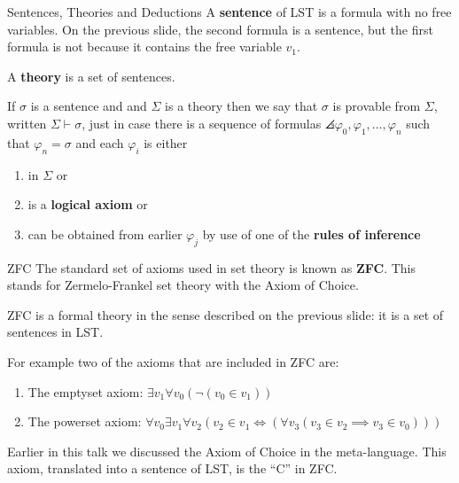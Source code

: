 \documentclass[pdf,final]{prosper}
\newcommand{\skipsmall}{\vspace{1em}}
\begin{document}
\begin{slide}{Sentences, Theories and Deductions}
A \textbf{sentence} of LST is a formula with no free variables. On the previous
slide, the second formula is a sentence, but the first formula is not because it
contains the free variable $v_1$.

\skipsmall

A \textbf{theory} is a set of sentences.

\skipsmall

If $\sigma$ is a sentence and and $\Sigma$ is a theory then we say that $\sigma$
is provable from $\Sigma$, written $\Sigma\vdash\sigma$, just in case there is a
sequence of formulas $\angles{\varphi_0,\varphi_1,\dots,\varphi_n}$ such that
$\varphi_n=\sigma$ and each $\varphi_i$ is either
\begin{enumerate}
  \item in $\Sigma$ or
  \item is a \textbf{logical axiom} or
  \item can be obtained from earlier $\varphi_j$ by use of one of the \textbf{rules
  of inference}
\end{enumerate}

\end{slide}

\begin{slide}{ZFC}
The standard set of axioms used in set theory is known as \textbf{ZFC}. This
stands for Zermelo-Frankel set theory with the Axiom of Choice.

\skipsmall

ZFC is a formal theory in the sense described on the previous slide: it is a set
of sentences in LST.

\skipsmall

For example two of the axioms that are included in ZFC are:

\begin{enumerate}
  \item The emptyset axiom: $\exists v_1\forall v_0(\neg(v_0\in v_1))$
  \item The powerset axiom: $\forall v_0 \exists v_1 \forall v_2 (v_2\in v_1 \iff (\forall
  v_3(v_3\in v_2\implies v_3\in v_0)))$
\end{enumerate}

Earlier in this talk we discussed the Axiom of Choice in the meta-language. This
axiom, translated into a sentence of LST, is the ``C'' in ZFC.
\end{slide}
\end{document}
